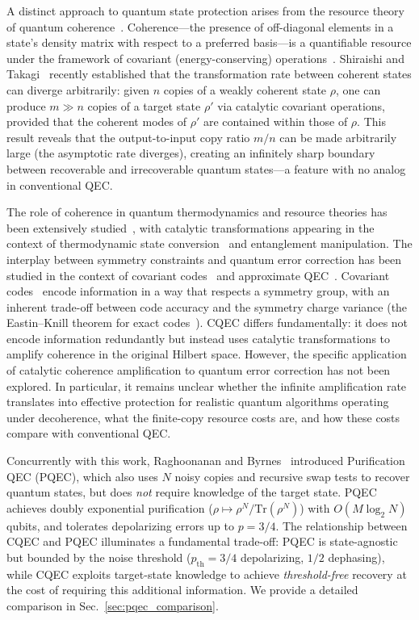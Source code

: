 \documentclass[prx,twocolumn,superscriptaddress,longbibliography,floatfix]{revtex4-2}
\begin{document}
A distinct approach to quantum state protection arises from the resource theory of quantum coherence~\cite{Baumgratz2014,Streltsov2017}.
Coherence---the presence of off-diagonal elements in a state's density matrix with respect to a preferred basis---is a quantifiable resource under the framework of covariant (energy-conserving) operations~\cite{Marvian2014,Lostaglio2019}.
Shiraishi and Takagi~\cite{Shiraishi2024} recently established that the transformation rate between coherent states can diverge arbitrarily: given $n$ copies of a weakly coherent state $\rho$, one can produce $m \gg n$ copies of a target state $\rho'$ via catalytic covariant operations, provided that the coherent modes of $\rho'$ are contained within those of $\rho$.
This result reveals that the output-to-input copy ratio $m/n$ can be made arbitrarily large (the asymptotic rate diverges), creating an infinitely sharp boundary between recoverable and irrecoverable quantum states---a feature with no analog in conventional QEC.

The role of coherence in quantum thermodynamics and resource theories has been extensively studied~\cite{Lostaglio2019,Streltsov2017,Marvian2014}, with catalytic transformations appearing in the context of thermodynamic state conversion~\cite{Baumgratz2014} and entanglement manipulation.
The interplay between symmetry constraints and quantum error correction has been studied in the context of covariant codes~\cite{Faist2020} and approximate QEC~\cite{Hayden2008}.
Covariant codes~\cite{Faist2020} encode information in a way that respects a symmetry group, with an inherent trade-off between code accuracy and the symmetry charge variance (the Eastin--Knill theorem for exact codes~\cite{Eastin2009}).
CQEC differs fundamentally: it does not encode information redundantly but instead uses catalytic transformations to amplify coherence in the original Hilbert space.
However, the specific application of catalytic coherence amplification to quantum error correction has not been explored.
In particular, it remains unclear whether the infinite amplification rate translates into effective protection for realistic quantum algorithms operating under decoherence, what the finite-copy resource costs are, and how these costs compare with conventional QEC.

Concurrently with this work, Raghoonanan and Byrnes~\cite{Raghoonanan2026} introduced Purification QEC (PQEC), which also uses $N$ noisy copies and recursive swap tests to recover quantum states, but does \emph{not} require knowledge of the target state.
PQEC achieves doubly exponential purification ($\rho \mapsto \rho^N / \mathrm{Tr}(\rho^N)$) with $O(M \log_2 N)$ qubits, and tolerates depolarizing errors up to $p = 3/4$.
The relationship between CQEC and PQEC illuminates a fundamental trade-off: PQEC is state-agnostic but bounded by the noise threshold ($p_\mathrm{th} = 3/4$ depolarizing, $1/2$ dephasing), while CQEC exploits target-state knowledge to achieve \emph{threshold-free} recovery at the cost of requiring this additional information.
We provide a detailed comparison in Sec.~\ref{sec:pqec_comparison}.
\end{document}
